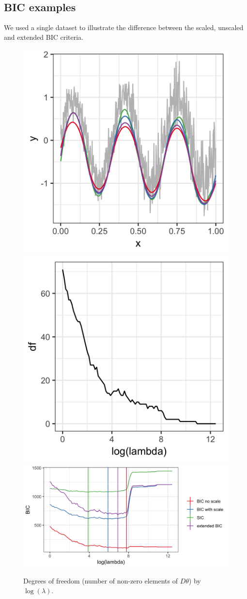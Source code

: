 \documentclass[12pt]{article}
\numberwithin{equation}{section}
\theoremstyle{plain}
\begin{document}
\subsection*{BIC examples}

We used a single dataset to illustrate the difference between the scaled, unscaled and extended BIC criteria. 

\begin{figure}[h!]
	\caption{Degrees of freedom (number of non-zero elements of $D\theta$) by $\log(\lambda)$.} 
	\includegraphics[width = 0.25\linewidth]{Figures/BIC_data.png}
	\includegraphics[width = 0.25\linewidth]{Figures/df_by_lambda.png}
	\includegraphics[width = 0.5\linewidth]{Figures/BIC_by_lambda.png}
\end{figure}
\end{document}
